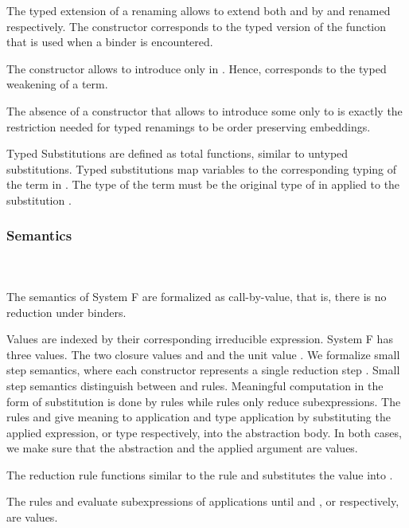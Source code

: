 \noindent The typed extension of a renaming  allows to extend both  and  by  and renamed  respectively. 
The constructor  corresponds to the typed version of the function  that is used when a binder is encountered. 

\noindent The constructor  allows to introduce  only in . 
Hence,  corresponds to the typed weakening  of a term.

\noindent The absence of a constructor that allows to introduce some  only to  is exactly the restriction needed for typed renamings to be order preserving embeddings.

\noindent Typed Substitutions are defined as total functions, similar to untyped substitutions.
\FSubTyping
Typed substitutions  map variables    to the corresponding typing of the term  in . 
The type of the term  must be the original type of  in  applied to the substitution .
\subsubsection{Semantics}\hfill\\\\
The semantics of System F are formalized as call-by-value, that is, there is no reduction under binders. 

\noindent Values are indexed by their corresponding irreducible expression.
\FVal
System F has three values. 
The two closure values  and  and the unit value .
We formalize small step semantics, where each constructor represents a single reduction step   .
Small step semantics distinguish between  and  rules. 
Meaningful computation in the form of substitution is done by  rules while  rules only reduce subexpressions.
\FSemantics
The rules  and  give meaning to application and type application by substituting the applied expression, or type respectively, into the abstraction body. 
In both cases, we make sure that the abstraction and the applied argument are values.

\noindent The reduction rule  functions similar to the rule  and substitutes the value  into . 

\noindent The rules  and  evaluate subexpressions of applications until  and , or  respectively, are values. 

